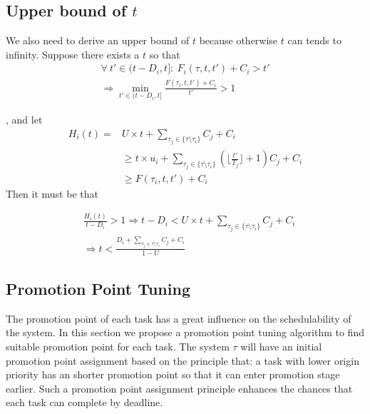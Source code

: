 \subsection{Upper bound of $t$}

We also need to derive an upper bound of $t$ because otherwise $t$ can tends to infinity. Suppose there exists a $t$ so that
\begin{align*}
\forall~t'\in(t-D_i,t]:~F_i(\tau,t,t')+C_i>t'\\
\Rightarrow\min_{t'\in(t-D_i,t]}\frac{F(\tau_i,t,t')+C_i}{t'}>1	
\end{align*}

, and let
\begin{align*}
H_i(t)= & U\times t+\sum_{\tau_j\in\{\tau\setminus\tau_i\}}C_j+C_i\\&\geq t\times u_i+\sum_{\tau_j\in\{\tau\setminus\tau_i\}}(\lfloor \frac{t'}{T_j} \rfloor+1)C_j+C_i\\
&\geq F(\tau_i,t,t')+C_i
\end{align*}
Then it must be that

\begin{align*}
&\frac{H_i(t)}{t-D_i}>1\Rightarrow t-D_i< U\times t+\sum_{\tau_j\in\{\tau\setminus \tau_i\}}C_j+C_i\\
&\Rightarrow t<\frac{D_i+\sum_{\tau_j\in\tau\setminus \tau_i}C_j+C_i}{1-U}
\end{align*}

\subsection{Promotion Point Tuning}
The promotion point of each task has a great influence on the schedulability of the system. In this section we propose a promotion point tuning algorithm to find  suitable promotion point for each task. The system $\tau$ will have an initial promotion point assignment based on the principle that: a task with lower origin priority has an shorter promotion point so that it can enter promotion stage earlier. Such a promotion point assignment principle enhances the chances that each task can complete by  deadline.

